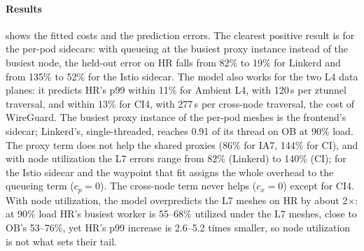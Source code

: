 \paragraph{Results}
 shows the fitted costs and the prediction errors. The
clearest positive result is for the per-pod sidecars: with queueing at the
busiest proxy instance instead of the busiest node, the held-out error on HR
falls from 82\% to 19\% for Linkerd and from 135\% to 52\% for the Istio
sidecar. The model also works for the two L4 data planes: it predicts HR's p99 within 11\% for Ambient
L4, with 120\,\textmu s per ztunnel traversal, and within 13\% for CI4, with
277\,\textmu s per cross-node traversal, the cost of WireGuard. The busiest
proxy instance of the per-pod meshes is the frontend's sidecar; Linkerd's,
single-threaded, reaches 0.91 of its thread on OB at 90\% load. The proxy
term does not help the shared proxies (86\% for IA7, 144\% for CI), and with
node utilization the L7 errors range from 82\% (Linkerd) to 140\% (CI); for
the Istio sidecar and the waypoint that fit assigns the whole overhead to the
queueing term ($c_p = 0$). The cross-node term never helps ($c_x = 0$) except
for CI4. With node utilization, the model overpredicts the L7 meshes on HR by
about 2$\times$: at 90\% load HR's busiest worker is 55--68\% utilized
under the L7 meshes, close to OB's 53--76\%, yet HR's p99 increase is 2.6--5.2
times smaller, so node utilization is not what sets their tail.

\begin{table}[t]
  \centering
  \caption{Model of the p99 increase (\cref{eq:model}), fitted on echo and OB,
           with the queueing term on the busiest node or on the busiest
           proxy instance. Median relative errors on HR (held out), on the
           placement cells (\cref{tab:placement}), and of the bottleneck law
           $X_{\max} \approx \lambda/\rho_{\text{hot}}$ (median over OB
           and HR). $c_p$, $c_x$, $q$: node variant.}
  \label{tab:model}
  \footnotesize
  \setlength{\tabcolsep}{2.5pt}
  
\end{table}

